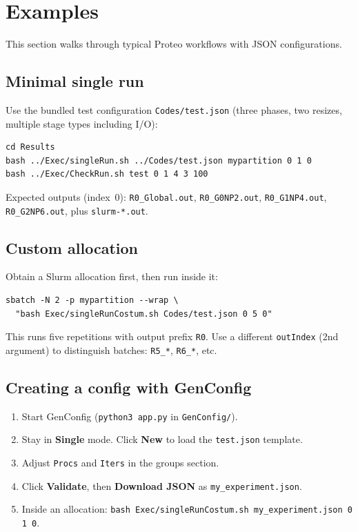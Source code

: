 \section{Examples}
\label{section:examples}

This section walks through typical Proteo workflows with JSON configurations.

\subsection{Minimal single run}

Use the bundled test configuration \texttt{Codes/test.json} (three phases, two resizes, multiple stage types including I/O):

\begin{lstlisting}[style=bashstyle,caption={Run test.json with Slurm auto-allocation.},captionpos=b]
cd Results
bash ../Exec/singleRun.sh ../Codes/test.json mypartition 0 1 0
bash ../Exec/CheckRun.sh test 0 1 4 3 100
\end{lstlisting}

Expected outputs (index~0): \texttt{R0\_Global.out}, \texttt{R0\_G0NP2.out}, \texttt{R0\_G1NP4.out}, \texttt{R0\_G2NP6.out}, plus \texttt{slurm-*.out}.

\subsection{Custom allocation}

Obtain a Slurm allocation first, then run inside it:

\begin{lstlisting}[style=bashstyle,caption={Run inside an sbatch allocation.},captionpos=b]
sbatch -N 2 -p mypartition --wrap \
  "bash Exec/singleRunCostum.sh Codes/test.json 0 5 0"
\end{lstlisting}

This runs five repetitions with output prefix \texttt{R0}. Use a different \texttt{outIndex} (2nd argument) to distinguish batches: \texttt{R5\_*}, \texttt{R6\_*}, etc.

\subsection{Creating a config with GenConfig}

\begin{enumerate}
  \item Start GenConfig (\texttt{python3 app.py} in \texttt{GenConfig/}).
  \item Stay in \textbf{Single} mode. Click \textbf{New} to load the \texttt{test.json} template.
  \item Adjust \texttt{Procs} and \texttt{Iters} in the groups section.
  \item Click \textbf{Validate}, then \textbf{Download JSON} as \texttt{my\_experiment.json}.
  \item Inside an allocation: \texttt{bash Exec/singleRunCostum.sh my\_experiment.json 0 1 0}.
\end{enumerate}

